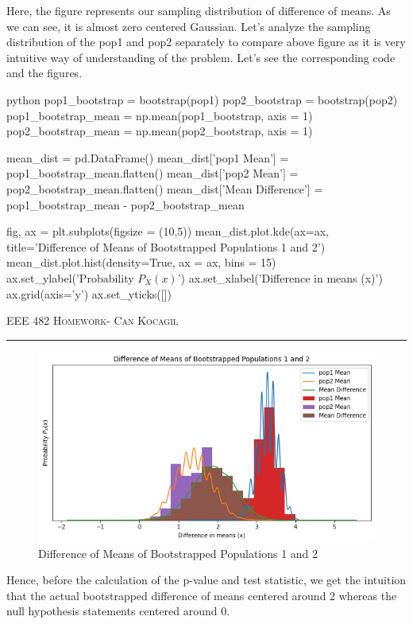 \documentclass[12pt]{amsart}
\begin{document}
Here, the figure represents our sampling distribution of difference of means. As we can see, it is almost zero centered Gaussian. Let's analyze the sampling distribution of the pop1 and pop2 separately to compare above figure as it is very intuitive way of understanding of the problem. Let's see the corresponding code and the figures.


\begin{mintedbox}{python}
pop1_bootstrap = bootstrap(pop1)
pop2_bootstrap = bootstrap(pop2)
pop1_bootstrap_mean = np.mean(pop1_bootstrap, axis = 1)
pop2_bootstrap_mean = np.mean(pop2_bootstrap, axis = 1)

mean_dist = pd.DataFrame()
mean_dist['pop1 Mean'] = pop1_bootstrap_mean.flatten()
mean_dist['pop2 Mean'] = pop2_bootstrap_mean.flatten()
mean_dist['Mean Difference'] = pop1_bootstrap_mean - pop2_bootstrap_mean

fig, ax = plt.subplots(figsize = (10,5))
mean_dist.plot.kde(ax=ax, title='Difference of Means of Bootstrapped Populations 1 and 2')
mean_dist.plot.hist(density=True, ax = ax, bins = 15)
ax.set_ylabel('Probability $P_X(x)$')
ax.set_xlabel('Difference in means (x)')
ax.grid(axis='y')
ax.set_yticks([])
\end{mintedbox}

\newpage
{\scshape EEE 482} \hfill {\scshape \large  Homework-\relax} \hfill {\scshape Can Kocagil}
\smallskip
\hrule
\vspace{2mm}

\begin{figure}[h]
    \centering
    \includegraphics[width = 1\textwidth]{images/6.png}
    \caption{Difference of Means of Bootstrapped Populations 1 and 2}
\end{figure}

Hence, before the calculation of the p-value and test statistic, we get the intuition that the actual bootstrapped difference of means centered around 2 whereas the null hypothesis statements centered around 0. 
\end{document}
